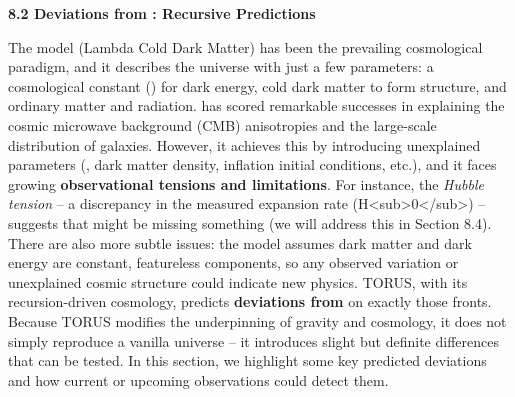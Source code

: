 \documentclass[
]{article}
\begin{document}
\textbf{8.2 Deviations from \LambdaCDM: Recursive Predictions}

The \LambdaCDM model (Lambda Cold Dark Matter) has been the prevailing
cosmological paradigm, and it describes the universe with just a few
parameters: a cosmological constant (\Lambda) for dark energy, cold dark
matter to form structure, and ordinary matter and radiation. \LambdaCDM has
scored remarkable successes in explaining the cosmic microwave
background (CMB) anisotropies and the large-scale distribution of
galaxies. However, it achieves this by introducing unexplained
parameters (\Lambda, dark matter density, inflation initial conditions, etc.),
and it faces growing \textbf{observational tensions and limitations}.
For instance, the \emph{Hubble tension} -- a discrepancy in the measured
expansion rate (H\textless sub\textgreater0\textless/sub\textgreater) --
suggests that \LambdaCDM might be missing something (we will address this in
Section 8.4). There are also more subtle issues: the model assumes dark
matter and dark energy are constant, featureless components, so any
observed variation or unexplained cosmic structure could indicate new
physics. TORUS, with its recursion-driven cosmology, predicts
\textbf{deviations from \LambdaCDM} on exactly those fronts. Because TORUS
modifies the underpinning of gravity and cosmology, it does not simply
reproduce a vanilla \LambdaCDM universe -- it introduces slight but definite
differences that can be tested. In this section, we highlight some key
predicted deviations and how current or upcoming observations could
detect them.
\end{document}
